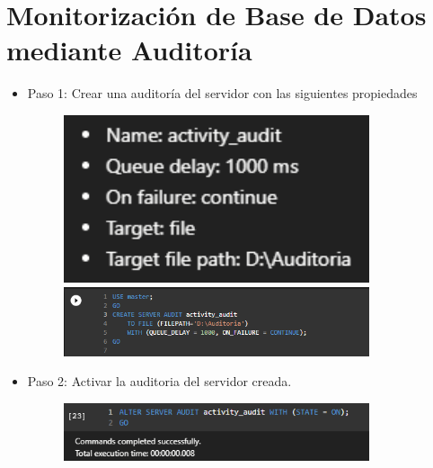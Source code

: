 \section{Monitorización de Base de Datos mediante Auditoría} 

\begin{itemize}
\subsection{Aplicando auditorias}
	
	\item Paso 1: Crear una auditoría del servidor con las siguientes propiedades
	
	\begin{figure}[htb]
	\begin{center}
	\includegraphics[width=9cm]{./Imagenes/audit1}
	\includegraphics[width=9cm]{./Imagenes/audit2}
	\end{center}
	\end{figure}
	
	\item Paso 2: Activar la auditoria del servidor creada.

	\begin{figure}[htb]
	\begin{center}
	\includegraphics[width=9cm]{./Imagenes/audit3}
	\end{center}
	\end{figure}


\end{itemize}
